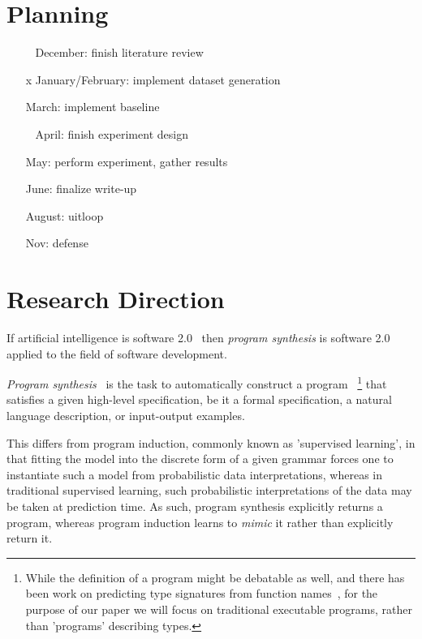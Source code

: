 \documentclass{article}
\begin{document}


\section{Planning} %

\begin{itemize}
    \item [~] December: finish literature review
    \item [x] January/February: implement dataset generation
    \item [ ] March: implement baseline
    \item [~] April: finish experiment design
    \item [ ] May: perform experiment, gather results
    \item [ ] June: finalize write-up
    \item [ ] August: uitloop
    \item [ ] Nov: defense
\end{itemize}

\section{Research Direction} %

If artificial intelligence is software 2.0~\citep{software20}
then \emph{program synthesis} is software 2.0 applied to the field of software development.

\emph{Program synthesis}~\citep{church1957applications} is the task to automatically construct a program%
~\footnote{While the definition of a program might be debatable as well, and there has been work on predicting type signatures from function names~\citep{wang2018predicting}, for the purpose of our paper we will focus on traditional executable programs, rather than 'programs' describing types.}%
that satisfies a given high-level specification,
be it a formal specification, a natural language description, or input-output examples.

This differs from program induction, commonly known as 'supervised learning',
in that fitting the model into the discrete form of a given grammar
forces one to instantiate such a model from probabilistic data interpretations,
whereas in traditional supervised learning,
such probabilistic interpretations of the data may be taken at prediction time.
As such, program synthesis explicitly returns a program, whereas program induction learns to \emph{mimic} it rather than explicitly return it.~\citep{nps}
\end{document}
